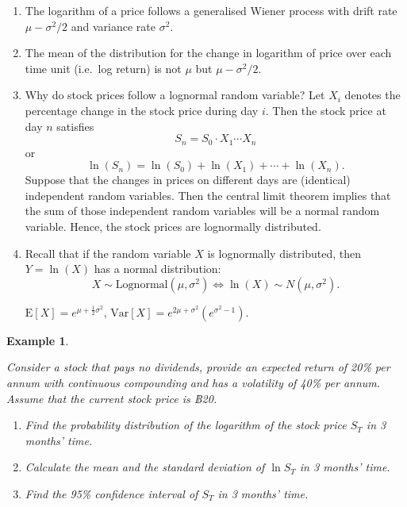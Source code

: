 \documentclass[landscape, 20pt]{extreport}
\theoremstyle{definition}
\theoremstyle{definition}
\newtheorem{example}{Example}[chapter]
\theoremstyle{definition}
\theoremstyle{definition}
\theoremstyle{remark}
\begin{document}
\begin{enumerate}
\def\labelenumi{\arabic{enumi}.}
\item
  The logarithm of a price follows a generalised Wiener process with
  drift rate \(\mu - \sigma^2/2\) and variance rate \(\sigma^2\).
\item
  The mean of the distribution for the change in logarithm of price
  over each time unit (i.e.~log return) is not \(\mu\) but
  \(\mu - \sigma^2/2\).
\item
  Why do stock prices follow a lognormal random variable? Let \(X_i\)
  denotes the percentage change in the stock price during day \(i\).
  Then the stock price at day \(n\) satisfies
  \[S_n = S_0 \cdot X_1 \cdots X_n\] or
  \[\ln(S_n) = \ln(S_0) + \ln(X_1) + \cdots + \ln(X_n).\] Suppose that
  the changes in prices on different days are (identical) independent
  random variables. Then the central limit theorem implies that the
  sum of those independent random variables will be a normal random
  variable. Hence, the stock prices are lognormally distributed.
\item
  Recall that if the random variable \(X\) is lognormally distributed,
  then \(Y = \ln(X)\) has a normal distribution:
  \[X \sim \text{Lognormal}(\mu,\sigma^2)  \Longleftrightarrow \ln(X) \sim N(\mu,\sigma^2).\]

  \(\mathrm{E}[X] = e^{\mu + \frac{1}{2}\sigma^2}, \, \mathrm{Var}[X] = e^{2\mu + \sigma^2}\left( e^{\sigma^2 - 1} \right).\)
\end{enumerate}

\newpage \begin{example}
\protect\hypertarget{exm:unlabeled-div-73}{}\label{exm:unlabeled-div-73}

\emph{Consider a stock that pays no dividends, provide an
expected return of 20\% per annum with continuous compounding and has a
volatility of 40\% per annum. Assume that the current stock price is
฿20.}

\begin{enumerate}
\def\labelenumi{\arabic{enumi}.}
\item
  \emph{Find the probability distribution of the logarithm of the stock
  price \(S_T\) in 3 months' time.}
\item
  \emph{Calculate the mean and the standard deviation of \(\ln S_T\) in 3
  months' time.}
\item
  \emph{Find the 95\% confidence interval of \(S_T\) in 3 months' time.}
\end{enumerate}

\end{example}
\end{document}
